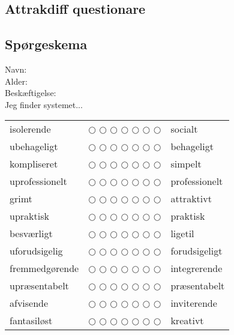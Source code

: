 \subsection{Attrakdiff questionare} \label{appendix:questionare}
\subsection*{Sp\o rgeskema}
Navn: \\
Alder: \\
Besk\ae ftigelse: \\



Jeg finder systemet...

\begin{table}[h]
\centering

\label{my-label}
\begin{tabular}{lll}
isolerende & $\bigcirc$ $\bigcirc$ $\bigcirc$ $\bigcirc$ $\bigcirc$ $\bigcirc$ $\bigcirc$ & socialt \\
ubehageligt & $\bigcirc$ $\bigcirc$ $\bigcirc$ $\bigcirc$ $\bigcirc$ $\bigcirc$ $\bigcirc$ & behageligt \\  
kompliseret & $\bigcirc$ $\bigcirc$ $\bigcirc$ $\bigcirc$ $\bigcirc$ $\bigcirc$ $\bigcirc$ & simpelt  \\
uprofessionelt & $\bigcirc$ $\bigcirc$ $\bigcirc$ $\bigcirc$ $\bigcirc$ $\bigcirc$ $\bigcirc$ & professionelt \\ 
grimt & $\bigcirc$ $\bigcirc$ $\bigcirc$ $\bigcirc$ $\bigcirc$ $\bigcirc$ $\bigcirc$ & attraktivt \\
upraktisk & $\bigcirc$ $\bigcirc$ $\bigcirc$ $\bigcirc$ $\bigcirc$ $\bigcirc$ $\bigcirc$ & praktisk   \\ 
besv\ae rligt & $\bigcirc$ $\bigcirc$ $\bigcirc$ $\bigcirc$ $\bigcirc$ $\bigcirc$ $\bigcirc$ & ligetil \\ 
uforudsigelig & $\bigcirc$ $\bigcirc$ $\bigcirc$ $\bigcirc$ $\bigcirc$ $\bigcirc$ $\bigcirc$ & forudsigeligt  \\
fremmedg\o rende & $\bigcirc$ $\bigcirc$ $\bigcirc$ $\bigcirc$ $\bigcirc$ $\bigcirc$ $\bigcirc$ & integrerende \\
upr\ae sentabelt & $\bigcirc$ $\bigcirc$ $\bigcirc$ $\bigcirc$ $\bigcirc$ $\bigcirc$ $\bigcirc$ & pr\ae sentabelt \\
afvisende & $\bigcirc$ $\bigcirc$ $\bigcirc$ $\bigcirc$ $\bigcirc$ $\bigcirc$ $\bigcirc$ & inviterende \\
fantasil\o st & $\bigcirc$ $\bigcirc$ $\bigcirc$ $\bigcirc$ $\bigcirc$ $\bigcirc$ $\bigcirc$ & kreativt \\

\end{tabular}
\end{table}
